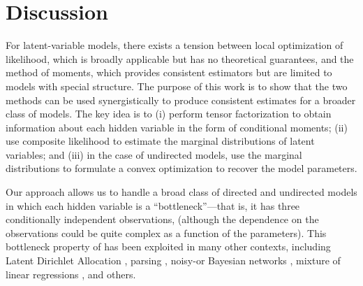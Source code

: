 \section{Discussion}
\label{sec:discussion}

For latent-variable models,
there exists a tension between
local optimization of likelihood,
which is broadly applicable but has no theoretical guarantees,
and the method of moments, which provides consistent estimators
but are limited to models with special structure.
The purpose of this work is to show that the two methods
can be used synergistically to produce consistent estimates
for a broader class of models.
The key idea is to (i) perform tensor factorization \citep{anandkumar13tensor} to
obtain information about each hidden variable in the form of conditional moments;
(ii) use composite likelihood to estimate the marginal distributions of latent variables;
and (iii) in the case of undirected models,
use the marginal distributions to formulate a convex optimization to
recover the model parameters.

Our approach allows us to handle a broad class of directed and undirected
models in which each hidden variable is a ``bottleneck''---that is,
it has three conditionally independent observations,
(although the dependence on the observations could be quite complex as a function of the parameters).
This bottleneck property of \citep{anandkumar13tensor}
has been exploited in many other contexts,
including Latent Dirichlet Allocation \cite{anandkumar12lda},
parsing \cite{hsu12identifiability},
noisy-or Bayesian networks \cite{halpern13noisyor},
mixture of linear regressions \cite{chaganty13regression},
and others.





